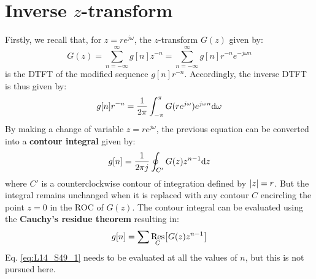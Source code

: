 \documentclass[../../main/main.tex]{subfiles}
\begin{document}
\section{\boldmath Inverse \( z \)-transform}
Firstly, we recall that, for \( z = re^{j\omega} \), the \( z \)-transform \( G(z) \) given by:
\begin{equation}
    G(z)
    =
    \sum_{n=-\infty}^{\infty} g[n]z^{-n}
    =
    \sum_{n=-\infty}^{\infty} g[n]r^{-n}e^{-j\omega n}
    \label{eq:L14_S47_1}
\end{equation}
is the DTFT of the modified sequence \( g[n]r^{-n} \). Accordingly, the inverse DTFT is thus given by:
\begin{equation}
    g[n]r^{-n}
    =
    \frac{1}{2\pi} \int_{-\pi}^{\pi} G(re^{j\omega})e^{j\omega n} \mathrm{d}{\omega}
    \label{eq:L14_S47_2}
\end{equation}
By making a change of variable \( z = re^{j\omega} \), the previous equation can be converted into a \textbf{contour integral} given by:
\begin{equation}
    g[n]
    =
    \frac{1}{2\pi j} \oint_{C'} G(z)z^{n-1} \mathrm{d}{z}
    \label{eq:L14_S48_1}
\end{equation}
where \( C' \) is a counterclockwise contour of integration defined by \( \abs{z} = r \).
But the integral remains unchanged when it is replaced with any contour \( C \) encircling the point \( z = 0 \) in the ROC of \( G(z) \). The contour integral can be evaluated using the \textbf{Cauchy's residue theorem} resulting in:
\begin{equation}
    g[n]
    =
    \sum \underset{C}{\operatorname{Res}}\qty[G(z)z^{n-1}]
    \label{eq:L14_S49_1}
\end{equation}
Eq. \ref{eq:L14_S49_1} needs to be evaluated at all the values of \( n \), but this is not pursued here.
\end{document}
